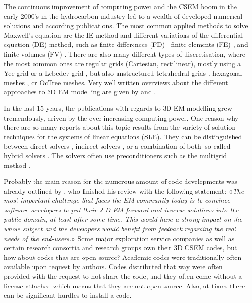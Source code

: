 \documentclass[
    paper,
  ]{geophysics}
\begin{document}
The continuous improvement of computing power and the CSEM boom in the early
2000's in the hydrocarbon industry led to a wealth of developed numerical
solutions and according publications. The most common applied methods to solve
Maxwell's equation are the IE method \citep{GJI.74.Raiche, RS.02.Hursan,
GEO.06.Zhdanov, GP.10.Tehrani, CAG.16.Kruglyakov, MGS.17.Kruglyakov} and
different variations of the differential equation (DE) method, such as finite
differences (FD) \citep{IEEE.66.Yee, GEO.93.Wang, RSC.94.Mackie, RS.94.Druskin,
GEO.09.Streich, CAG.13.Sommer}, finite elements (FE) \citep{GJI.11.Schwarzbach,
GEO.04.Commer, GEO.12.daSilva, GJI.13.Puzyrev, GJI.13.Grayver, SEG.16.Zhang},
and finite volumes (FV) \citep{EM.90.Madsen, ECP.07.Haber, GEO.14.Jahandari,
PIER.01.Clemens, GP.06.Mulder}. There are also many different types of
discretisation, where the most common ones are regular grids (Cartesian,
rectilinear), mostly using a Yee grid \citep{IEEE.66.Yee} or a Lebedev grid
\citep{CMMP.64.Lebedev}, but also unstructured tetrahedral grids
\citep{SEG.16.Zhang, CAG.17.Cai}, hexagonal meshes \citep{CAG.14.Cai}, or
OcTree meshes\citep{ECP.07.Haber}. Very well written overviews about the
different approaches to 3D EM modelling are given by \cite{SG.05.Avdeev} and
\cite{SG.10.Borner}.

In the last 15 years, the publications with regards to 3D EM modelling grew
tremendously, driven by the ever increasing computing power. One reason why
there are so many reports about this topic results from the variety of solution
techniques for the systems of linear equations (SLE). They can be distinguished
between direct solvers \citep{GEO.09.Streich, GEO.15.Grayver, GP.14.Chung,
GEO.14.Jaysaval, SEG.15.Oh, GJI.18.Wang}, indirect solvers \citep{GP.06.Mulder,
GJI.15.Jaysaval}, or a combination of both, so-called hybrid solvers
\citep{GEO.18.Liu}. The solvers often use preconditioners such as the multigrid
method \citep{SIAM.02.Aruliah, GP.06.Mulder, GJI.16.Jaysaval}.

Probably the main reason for the numerous amount of code developments was
already outlined by \cite{SG.05.Avdeev}, who finished his review with the
following statement: «\emph{The most important challenge that faces the EM
community today is to convince software developers to put their 3-D EM forward
and inverse solutions into the public domain, at least after some time. This
would have a strong impact on the whole subject and the developers would
benefit from feedback regarding the real needs of the end-users.}» Some major
exploration service companies as well as certain research consortia and
research groups own their 3D CSEM codes, but how about codes that are
open-source? Academic codes were traditionally often available upon request by
authors. Codes distributed that way were often provided with the request to not
share the code, and they often come without a license attached which means that
they are not open-source. Also, at times there can be significant hurdles to
install a code.
\end{document}
